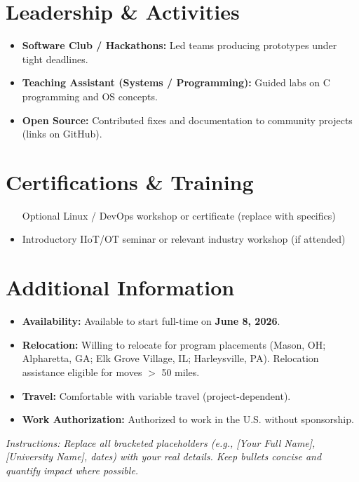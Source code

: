 \documentclass[11pt]{article}
\begin{document}
\section*{Leadership \& Activities}
\begin{itemize}
  \item \textbf{Software Club / Hackathons:} Led teams producing prototypes under tight deadlines.
  \item \textbf{Teaching Assistant (Systems / Programming):} Guided labs on C programming and OS concepts.
  \item \textbf{Open Source:} Contributed fixes and documentation to community projects (links on GitHub).
\end{itemize}

\section*{Certifications \& Training}
\begin{itemize}
  \item [Optional] Linux / DevOps workshop or certificate (replace with specifics)
  \item Introductory IIoT/OT seminar or relevant industry workshop (if attended)
\end{itemize}

\section*{Additional Information}
\begin{itemize}
  \item \textbf{Availability:} Available to start full-time on \textbf{June 8, 2026}.
  \item \textbf{Relocation:} Willing to relocate for program placements (Mason, OH; Alpharetta, GA; Elk Grove Village, IL; Harleysville, PA). Relocation assistance eligible for moves $>$ 50 miles.
  \item \textbf{Travel:} Comfortable with variable travel (project-dependent).
  \item \textbf{Work Authorization:} Authorized to work in the U.S. without sponsorship. %
\end{itemize}

\vspace{6pt}
\noindent\textit{Instructions: Replace all bracketed placeholders (e.g., [Your Full Name], [University Name], dates) with your real details. Keep bullets concise and quantify impact where possible.}
\end{document}
